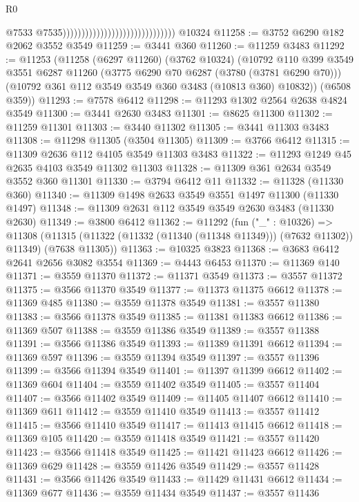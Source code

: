\begin{lexlean}{R0}
\begin{coremodule}
                                                                @7533
                                                                @7535))))))))))))))))))))))))))))))
    @10324
@11258 := @3752 @6290 @182 @2062 @3552 @3549
@11259 := @3441 @360
@11260 := @11259 @3483
@11292 := @11253
    (@11258
      (@6297 @11260)
      (@3762 @10324)
      (@10792
        @110
        @399
        @3549
        @3551
        @6287
        @11260
        (@3775 @6290 @70 @6287 (@3780 (@3781 @6290 @70)))
        (@10792 @361 @112 @3549 @3549 @360 @3483 (@10813 @360) @10832))
      (@6508 @359))
@11293 := @7578 @6412
@11298 := @11293 @1302 @2564 @2638 @4824 @3549
@11300 := @3441 @2630 @3483
@11301 := @8625 @11300
@11302 := @11259 @11301
@11303 := @3440 @11302
@11305 := @3441 @11303 @3483
@11308 := @11298 @11305 (@3504 @11305)
@11309 := @3766 @6412
@11315 := @11309 @2636 @112 @4105 @3549 @11303 @3483
@11322 := @11293 @1249 @45 @2635 @4103 @3549 @11302 @11303
@11328 := @11309 @361 @2634 @3549 @3552 @360 @11301
@11330 := @3794 @6412 @11
@11332 := @11328 (@11330 @360)
@11340 := @11309 @1498 @2633 @3549 @3551 @1497 @11300 (@11330 @1497)
@11348 := @11309 @2631 @112 @3549 @3549 @2630 @3483 (@11330 @2630)
@11349 := @3800 @6412
@11362 := @11292
    (fun ("_" : @10326) =>
    @11308 (@11315 (@11322 (@11332 (@11340 (@11348 @11349))) (@7632 @11302)) @11349) (@7638 @11305))
@11363 := @10325 @3823
@11368 := @3683 @6412 @2641 @2656 @3082 @3554
@11369 := @4443 @6453
@11370 := @11369 @140
@11371 := @3559 @11370
@11372 := @11371 @3549
@11373 := @3557 @11372
@11375 := @3566 @11370 @3549
@11377 := @11373 @11375 @6612
@11378 := @11369 @485
@11380 := @3559 @11378 @3549
@11381 := @3557 @11380
@11383 := @3566 @11378 @3549
@11385 := @11381 @11383 @6612
@11386 := @11369 @507
@11388 := @3559 @11386 @3549
@11389 := @3557 @11388
@11391 := @3566 @11386 @3549
@11393 := @11389 @11391 @6612
@11394 := @11369 @597
@11396 := @3559 @11394 @3549
@11397 := @3557 @11396
@11399 := @3566 @11394 @3549
@11401 := @11397 @11399 @6612
@11402 := @11369 @604
@11404 := @3559 @11402 @3549
@11405 := @3557 @11404
@11407 := @3566 @11402 @3549
@11409 := @11405 @11407 @6612
@11410 := @11369 @611
@11412 := @3559 @11410 @3549
@11413 := @3557 @11412
@11415 := @3566 @11410 @3549
@11417 := @11413 @11415 @6612
@11418 := @11369 @105
@11420 := @3559 @11418 @3549
@11421 := @3557 @11420
@11423 := @3566 @11418 @3549
@11425 := @11421 @11423 @6612
@11426 := @11369 @629
@11428 := @3559 @11426 @3549
@11429 := @3557 @11428
@11431 := @3566 @11426 @3549
@11433 := @11429 @11431 @6612
@11434 := @11369 @677
@11436 := @3559 @11434 @3549
@11437 := @3557 @11436

\end{coremodule}
\end{lexlean}
